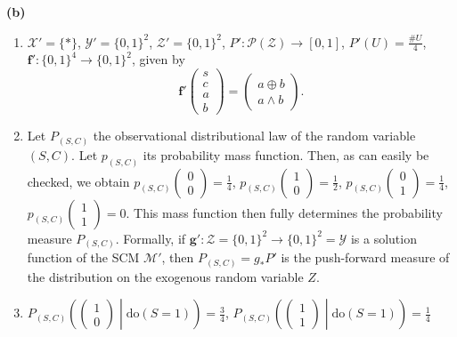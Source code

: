 \begin{gradedsolution}
    \textbf{(b)}
    \begin{enumerate}
      \item $\boldsymbol{\mathcal{X}}' = \{*\}$, $\boldsymbol{\mathcal{Y}}' = \{0,1\}^{2}$, $\boldsymbol{\mathcal{Z}}' = \{0,1\}^{2}$, $P': \mathcal{P}(\boldsymbol{\mathcal{Z}}) \to [0,1]$, $P'(U) = \frac{\# U}{4}$, $\boldsymbol{f}': \{0,1\}^{4} \to \{0,1\}^{2}$, given by 
	\begin{equation}
	  \boldsymbol{f}' \begin{pmatrix} s \\ c \\ a \\ b \end{pmatrix} = \begin{pmatrix} a \oplus b \\ a \land b \end{pmatrix}.
	  \label{eq:probabilistic_case}
	\end{equation}
      \item Let $P_{(S,C)}$ the observational distributional law of the random variable $(S,C)$. 
	Let $p_{(S,C)}$ its probability mass function. 
	Then, as can easily be checked, we obtain $p_{(S,C)}\begin{pmatrix} 0 \\ 0 \end{pmatrix} = \frac{1}{4}$, $p_{(S,C)}\begin{pmatrix} 1 \\ 0 \end{pmatrix} = \frac{1}{2}$, $p_{(S,C)}\begin{pmatrix} 0 \\ 1 \end{pmatrix} = \frac{1}{4}$, $p_{(S,C)}\begin{pmatrix} 1 \\ 1 \end{pmatrix} = 0$.
	This mass function then fully determines the probability measure $P_{(S,C)}$.
	Formally, if $\boldsymbol{g}': \boldsymbol{\mathcal{Z}} = \{0,1\}^{2} \to \{0,1\}^{2} = \boldsymbol{\mathcal{Y}}$ is a solution function of the SCM $\mathcal{M}'$, then $P_{(S,C)} = g_*P'$ is the push-forward measure of the distribution on the exogenous random variable $Z$.
      \item $P_{(S,C)}\left( \begin{pmatrix} 1 \\ 0 \end{pmatrix} \middle| \text{do}(S=1)\right) = \frac{3}{4}$, $P_{(S,C)}\left( \begin{pmatrix} 1 \\ 1 \end{pmatrix} \middle| \text{do}(S=1)\right) = \frac{1}{4}$

\end{enumerate}
\end{gradedsolution}
